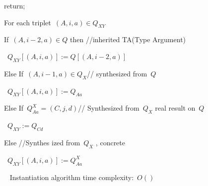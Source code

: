 \begin{algorithmic}
\begin{description}
\begin{description}
\begin{enumerate}
              \begin{enumerate}
                \STATE return;
              \end{enumerate}
        \STATE For each triplet~$(A,i,a)∈Q_{XY}$
              \begin{enumerate}
                \STATE If~$(A,i-2,a)∈Q$ then //inherited TA(Type Argument)
                      \begin{enumerate}
                        \STATE~$Q_{XY}[(A,i,a)]:=Q[(A,i-2,a)]$
                      \end{enumerate}
                \STATE Else If~$(A,i-1,a)∈Q_{X}$// synthesized from~$Q$
                      \begin{enumerate}
                        \STATE~$Q_{XY}[(A,i,a)]:=Q_{Aa}$
                      \end{enumerate}
                \STATE Else If~$Q_{Aa}^{X}=(C,j,d)$// Synthesized from~$Q_{X}$
                      real result on~$Q$
                      \begin{enumerate}
                        \STATE~$Q_{XY}:=Q_{Cd}$
                      \end{enumerate}
                \STATE Else //Synthes ized from~$Q_{X}$ , concrete
                      \begin{enumerate}
                        \STATE~$Q_{XY}[(A,i,a)]:=Q_{Aa}^{X}$
                      \end{enumerate}
              \end{enumerate}
      \end{enumerate}
    \end{description}
    \STATE [{Complexity:}]~
    Instantiation algorithm time complexity:~$O()$
\end{description}
    \end{algorithmic}
